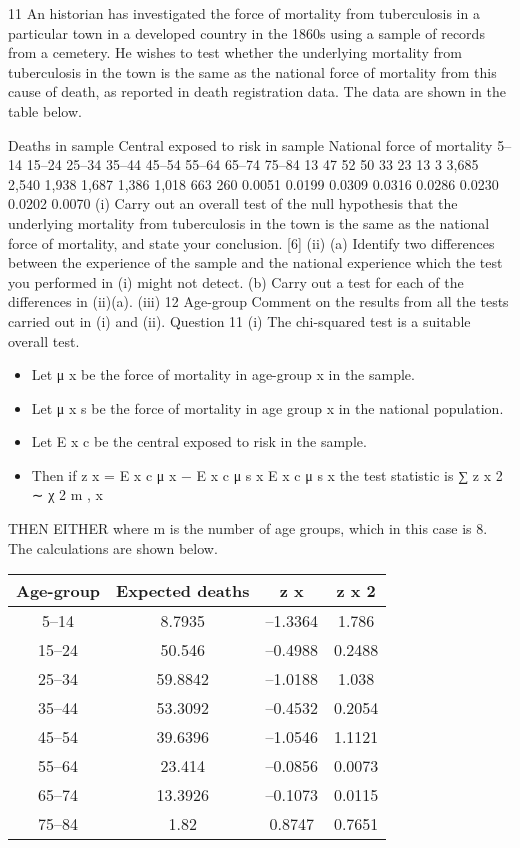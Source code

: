 \documentclass[a4paper,12pt]{article}
\begin{document}
\begin{enumerate}
11
An historian has investigated the force of mortality from tuberculosis in a particular town in a developed country in the 1860s using a sample of records from a cemetery. He wishes to test whether the underlying mortality from tuberculosis in the town is
the same as the national force of mortality from this cause of death, as reported in death registration data. The data are shown in the table below.

Deaths in
sample Central exposed to
risk in sample National force
of mortality
5–14
15–24
25–34
35–44
45–54
55–64
65–74
75–84 13
47
52
50
33
23
13
3 3,685
2,540
1,938
1,687
1,386
1,018
663
260 0.0051
0.0199
0.0309
0.0316
0.0286
0.0230
0.0202
0.0070
(i) Carry out an overall test of the null hypothesis that the underlying mortality
from tuberculosis in the town is the same as the national force of mortality,
and state your conclusion.
[6]
(ii) (a)
Identify two differences between the experience of the sample
and the national experience which the test you performed in (i)
might not detect.
(b)
Carry out a test for each of the differences in (ii)(a).
(iii)
12
Age-group
Comment on the results from all the tests carried out in (i) and (ii).
\newpage
Question 11
(i)
The chi-squared test is a suitable overall test.
\begin{itemize}
\item Let μ x be the force of mortality in age-group x in the sample.
\item Let μ x s be the force of mortality in age group x in the national population.
\item Let E x c be the central exposed to risk in the sample.
\item Then if z x =
E x c μ x − E x c μ s x
E x c μ s x
the test statistic is
∑ z x 2 ∼ χ 2 m ,
x
\end{itemize}
THEN EITHER
where m is the number of age groups, which in this case is 8.
The calculations are shown below.





\begin{center}
\begin{tabular}{|c|c|c|c|}
Age-group	&	 Expected deaths	&	 z x 	&	z x 2	\\ \hline
5–14	&	8.7935	&	–1.3364	&	1.786	\\ \hline
15–24	&	50.546	&	–0.4988	&	0.2488	\\ \hline
25–34	&	59.8842	&	–1.0188	&	1.038	\\ \hline
35–44	&	53.3092	&	–0.4532	&	0.2054	\\ \hline
45–54	&	39.6396	&	–1.0546	&	1.1121	\\ \hline
55–64	&	23.414	&	–0.0856	&	0.0073	\\ \hline
65–74	&	13.3926	&	–0.1073	&	0.0115	\\ \hline
75–84 	&	1.82	&	0.8747	&	0.7651	\\ \hline
\end{tabular}
\end{center}


\end{enumerate}
\end{document}
